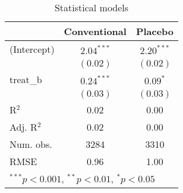 
\begin{table}
\begin{center}
\begin{tabular}{l c c }
\hline
 & Conventional & Placebo \\
\hline
(Intercept) & $2.04^{***}$ & $2.20^{***}$ \\
            & $(0.02)$     & $(0.02)$     \\
treat\_b    & $0.24^{***}$ & $0.09^{*}$   \\
            & $(0.03)$     & $(0.03)$     \\
\hline
R$^2$       & 0.02         & 0.00         \\
Adj. R$^2$  & 0.02         & 0.00         \\
Num. obs.   & 3284         & 3310         \\
RMSE        & 0.96         & 1.00         \\
\hline
\multicolumn{3}{l}{\scriptsize{$^{***}p<0.001$, $^{**}p<0.01$, $^*p<0.05$}}
\end{tabular}
\caption{Statistical models}
\label{table:coefficients}
\end{center}
\end{table}
